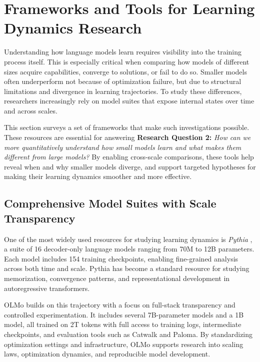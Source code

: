 \section{Frameworks and Tools for Learning Dynamics Research}

Understanding how language models learn requires visibility into the training process itself. This is especially critical when comparing how models of different sizes acquire capabilities, converge to solutions, or fail to do so. Smaller models often underperform not because of optimization failure, but due to structural limitations and divergence in learning trajectories. To study these differences, researchers increasingly rely on model suites that expose internal states over time and across scales.

This section surveys a set of frameworks that make such investigations possible. These resources are essential for answering \textbf{Research Question 2:} \textit{How can we more quantitatively understand how small models learn and what makes them different from large models?} By enabling cross-scale comparisons, these tools help reveal when and why smaller models diverge, and support targeted hypotheses for making their learning dynamics smoother and more effective.

\subsection{Comprehensive Model Suites with Scale Transparency}

One of the most widely used resources for studying learning dynamics is \textit{Pythia} \citep{biderman2023pythia}, a suite of 16 decoder-only language models ranging from 70M to 12B parameters. Each model includes 154 training checkpoints, enabling fine-grained analysis across both time and scale. Pythia has become a standard resource for studying memorization, convergence patterns, and representational development in autoregressive transformers.

OLMo \citep{groeneveld2024olmo} builds on this trajectory with a focus on full-stack transparency and controlled experimentation. It includes several 7B-parameter models and a 1B model, all trained on 2T tokens with full access to training logs, intermediate checkpoints, and evaluation tools such as Catwalk and Paloma. By standardizing optimization settings and infrastructure, OLMo supports research into scaling laws, optimization dynamics, and reproducible model development.

